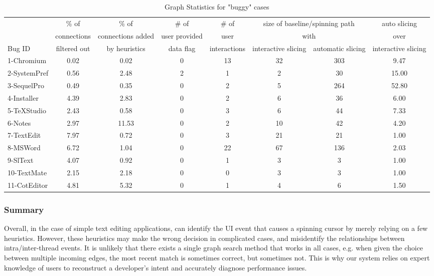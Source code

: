\begin{table*}[ht]
\footnotesize
\centering
  \begin{tabularx}{\textwidth}{l|ccccccc}
 	   & \% of & \% of & \# of& \# of & \multicolumn{2}{c}{size of baseline/spinning path}& auto slicing\\
       & connections & connections added  & user provided & user  & \multicolumn{2}{c}{with}  & over \\
Bug ID & filtered out & by heuristics & data flag & interactions & interactive slicing & automatic slicing &  interactive slicing\\
\hline
\hline
1-Chromium & 0.02 & 0.02 & 0 & 13 & 32 & 303 & 9.47\\
2-SystemPref & 0.56 & 2.48 & 2 & 1 & 2 & 30 & 15.00\\
3-SequelPro & 0.49 & 0.35 & 0 & 2 & 5 & 264 & 52.80\\
4-Installer & 4.39 & 2.83 & 0 & 2 & 6 & 36  & 6.00\\
5-TeXStudio & 2.43 & 0.58 & 0 & 3 & 6 & 44  & 7.33\\
6-Notes & 2.97 & 11.53 & 0 & 2 & 10 & 42 & 4.20\\
7-TextEdit & 7.97 & 0.72 & 0 & 3 & 21 & 21 & 1.00\\
8-MSWord & 6.72 & 1.04 & 0 & 22 & 67 & 136 & 2.03\\
9-SlText & 4.07 & 0.92 & 0 & 1 & 3 & 3 & 1.00\\
10-TextMate & 2.15 & 2.18 & 0 & 0 & 3 & 3 & 1.00\\
11-CotEditor & 4.81 & 5.32 & 0 & 1 & 4 & 6 & 1.50\\
\hline
  \end{tabularx}
  \parbox{\textwidth}
  {\caption{Graph Statistics for "buggy" cases} 
    {
    }
  \label{table:results}
  }

\end{table*}



\subsubsection{Summary}
Overall, in the case of simple text editing applications, \xxx can identify the
UI event that causes a spinning cursor by merely relying on a few heuristics.
However, these heuristics may make the wrong decision in complicated cases, and
misidentify the relationships between intra/inter-thread events. It is unlikely
that there exists a single graph search method that works in all cases, e.g.
when given the choice between multiple incoming edges, the most recent match is
sometimes correct, but sometimes not. This is why our system relies on expert
knowledge of users to reconstruct a developer's intent and accurately diagnose
performance issues.
